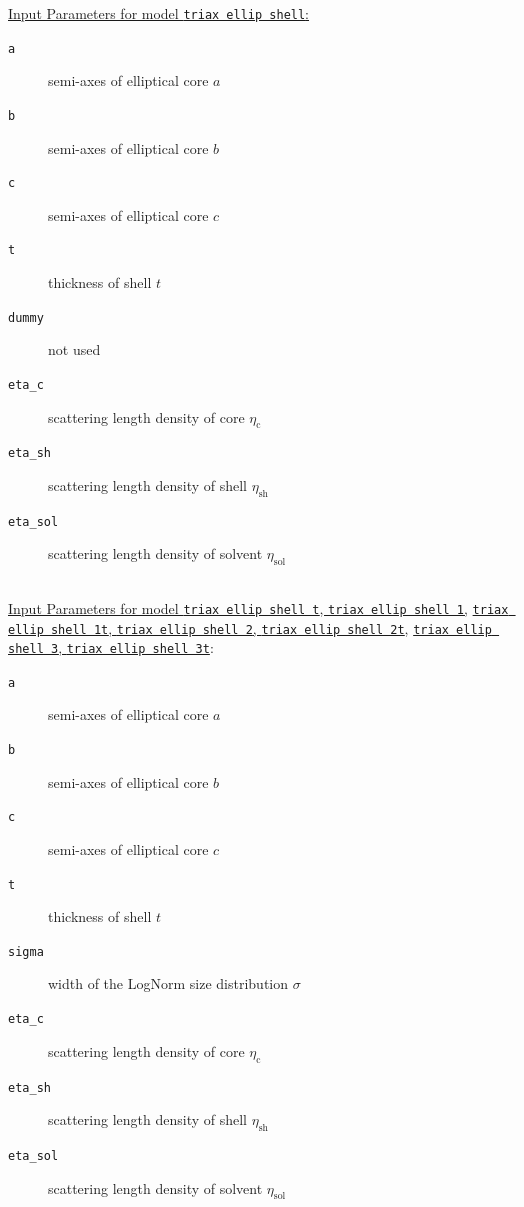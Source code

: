 \vspace{3cm}
\noindent \underline{Input Parameters for model \texttt{triax ellip shell}:}
\begin{description}
\item[\texttt{a}] semi-axes of elliptical core $a$
\item[\texttt{b}] semi-axes of elliptical core $b$
\item[\texttt{c}] semi-axes of elliptical core $c$
\item[\texttt{t}] thickness of shell $t$
\item[\texttt{dummy}] not used
\item[\texttt{eta\_c}] scattering length density of core $\eta_\text{c}$
\item[\texttt{eta\_sh}] scattering length density of shell $\eta_\text{sh}$
\item[\texttt{eta\_sol}] scattering length density of solvent $\eta_\text{sol}$
\end{description}
~\\
\underline{Input Parameters for model \texttt{triax ellip shell t}, \texttt{triax ellip shell 1},}
\underline{\texttt{triax ellip shell 1t}, \texttt{triax ellip shell 2}, \texttt{triax ellip shell 2t},}
\underline{\texttt{triax ellip shell 3}, \texttt{triax ellip shell 3t}}:
\begin{description}
\item[\texttt{a}] semi-axes of elliptical core $a$
\item[\texttt{b}] semi-axes of elliptical core $b$
\item[\texttt{c}] semi-axes of elliptical core $c$
\item[\texttt{t}] thickness of shell $t$
\item[\texttt{sigma}] width of the LogNorm size distribution $\sigma$
\item[\texttt{eta\_c}] scattering length density of core $\eta_\text{c}$
\item[\texttt{eta\_sh}] scattering length density of shell $\eta_\text{sh}$
\item[\texttt{eta\_sol}] scattering length density of solvent $\eta_\text{sol}$
\end{description}


